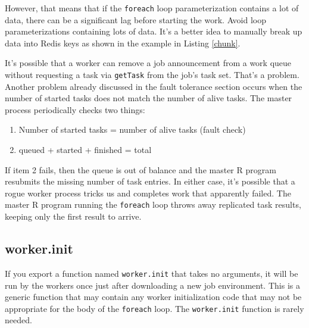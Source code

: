\documentclass[12pt]{article}
\begin{document}
However, that means that if the \verb+foreach+ loop parameterization contains a
lot of data, there can be a significant lag before starting the work. Avoid
loop parameterizations containing lots of data. It's a better idea to manually
break up data into Redis keys as shown in the example in Listing \ref{chunk}.

It's possible that a worker can remove a job announcement from a work queue
without requesting a task via \verb+getTask+ from the job's task set. That's
a problem. Another problem already discussed in the fault tolerance section
occurs when the number of started tasks does not match the number of alive
tasks.  The master process periodically checks two things:
\begin{enumerate}
\item Number of started tasks = number of alive tasks (fault check)
\item queued + started + finished = total
\end{enumerate}
If item 2 fails, then the queue is out of balance and the master R program
resubmits the missing number of task entries. In either case, it's possible
that a rogue worker process tricks us and completes work that apparently
failed. The master R program running the \verb+foreach+ loop throws away
replicated task results, keeping only the first result to arrive.


\subsection{worker.init}

If you export a function named \verb+worker.init+ that takes no arguments, it
will be run by the workers once just after downloading a new job environment.
This is a generic function that may contain any worker initialization code that
may not be appropriate for the body of the \verb+foreach+ loop.
The \verb+worker.init+ function is rarely needed.
\end{document}
